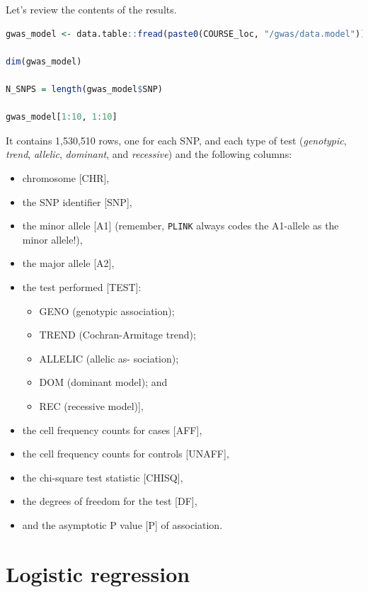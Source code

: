 \documentclass[
]{book}
\newcommand{\passthrough}[1]{#1}
\providecommand{\tightlist}{%
  \setlength{\itemsep}{0pt}\setlength{\parskip}{0pt}}
\begin{document}
Let's review the contents of the results.

\begin{lstlisting}[language=R]
gwas_model <- data.table::fread(paste0(COURSE_loc, "/gwas/data.model"))

dim(gwas_model)

N_SNPS = length(gwas_model$SNP)

gwas_model[1:10, 1:10]
\end{lstlisting}

It contains 1,530,510 rows, one for each SNP, and each type of test (\emph{genotypic}, \emph{trend}, \emph{allelic}, \emph{dominant}, and \emph{recessive}) and the following columns:

\begin{itemize}
\tightlist
\item
  chromosome {[}CHR{]},
\item
  the SNP identifier {[}SNP{]},
\item
  the minor allele {[}A1{]} (remember, \passthrough{\lstinline!PLINK!} always codes the A1-allele as the minor allele!),
\item
  the major allele {[}A2{]},
\item
  the test performed {[}TEST{]}:

  \begin{itemize}
  \tightlist
  \item
    GENO (genotypic association);
  \item
    TREND (Cochran-Armitage trend);
  \item
    ALLELIC (allelic as- sociation);
  \item
    DOM (dominant model); and
  \item
    REC (recessive model){]},
  \end{itemize}
\item
  the cell frequency counts for cases {[}AFF{]},
\item
  the cell frequency counts for controls {[}UNAFF{]},
\item
  the chi-square test statistic {[}CHISQ{]},
\item
  the degrees of freedom for the test {[}DF{]},
\item
  and the asymptotic P value {[}P{]} of association.
\end{itemize}

\hypertarget{logistic-regression}{%
\section{Logistic regression}\label{logistic-regression}}
\end{document}
